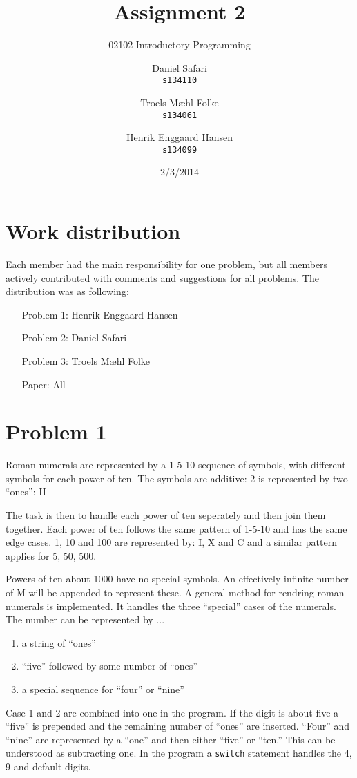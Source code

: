 \documentclass{scrartcl}
\newcommand\code[1]{\texttt{#1}}
\begin{document}

\title{Assignment 2}
\subtitle{02102 Introductory Programming}
\author{
  Daniel Safari\\
  \texttt{s134110}
  \and
  Troels Mæhl Folke\\
  \texttt{s134061}
   \and
  Henrik Enggaard Hansen\\
  \texttt{s134099}
}
\date{2/3/2014}
\maketitle
\thispagestyle{empty}
\setcounter{page}{0}
\null
\vfill
\section*{Work distribution}

Each member had the main responsibility for one problem, but all members
actively contributed with comments and suggestions for all problems. The
distribution was as following:
\begin{itemize}
\setlength{\itemindent}{3em}
\item[Problem 1:] Henrik Enggaard Hansen
\item[Problem 2:] Daniel Safari
\item[Problem 3:] Troels Mæhl Folke
\item[Paper:]  All
\end{itemize}
\newpage

\section*{Problem 1}

Roman numerals are represented by a 1-5-10 sequence of symbols, with different symbols for each power of ten. The symbols are additive: 2 is represented by two ``ones'': II

The task is then to handle each power of ten seperately and then join them together. Each power of ten follows the same pattern of 1-5-10 and has the same edge cases. 1, 10 and 100 are represented by: I, X and C and a similar pattern applies for 5, 50, 500.

Powers of ten about 1000 have no special symbols. An effectively infinite number of M will be appended to represent these.
A general method for rendring roman numerals is implemented. It handles the three ``special'' cases of the numerals. The number can be represented by ...
\begin{enumerate}
\item a string of ``ones''
\item ``five'' followed by some number of ``ones''
\item a special sequence for ``four'' or ``nine''
\end{enumerate}
Case 1 and 2 are combined into one in the program. If the digit is about five a ``five'' is prepended and the remaining number of ``ones'' are inserted. ``Four'' and ``nine'' are represented by a ``one'' and then either ``five'' or ``ten.'' This can be understood as subtracting one. In the program a \code{switch} statement handles the 4, 9 and default digits.
\end{document}
